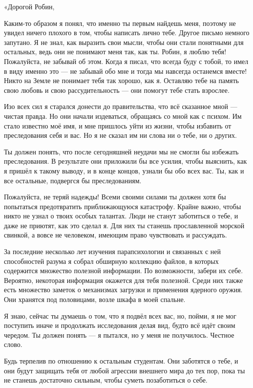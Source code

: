 \documentclass[a5paper, 9pt,
final, openany, twoside=true]{memoir}
\begin{document}
«Дорогой Робин,\bigskip

Каким-то образом я понял, что именно ты первым найдешь меня, поэтому не увидел ничего плохого в том, чтобы написать лично тебе. Другое письмо немного запутано. Я не знал, как выразить свои мысли, чтобы они стали понятными для остальных, ведь они не понимают меня так, как ты. Робин, я люблю тебя! Пожалуйста, не забывай об этом. Когда я писал, что всегда буду с тобой, то имел в виду именно это — не забывай обо мне и тогда мы навсегда останемся вместе! Никто на Земле не понимает тебя так хорошо, как я. Оставляю тебе на память свою любовь и свою рассудительность — они помогут тебе стать взрослее.

Изо всех сил я старался донести до правительства, что всё сказанное мной — чистая правда. Но они начали издеваться, обращаясь со мной как с психом. Им стало известно моё имя, и мне пришлось уйти из жизни, чтобы избавить от преследования себя и вас. Но я не сказал им ни слова ни о тебе, ни о других.

Ты должен понять, что после сегодняшней неудачи мы не смогли бы избежать преследования. В результате они приложили бы все усилия, чтобы выяснить, как я пришёл к такому выводу, и в конце концов, узнали бы обо всех вас. Ты, как и все остальные, подвергся бы преследованиям.

Пожалуйста, не теряй надежды! Всеми своими силами ты должен хотя бы попытаться предотвратить приближающуюся катастрофу. Крайне важно, чтобы никто не узнал о твоих особых талантах. Люди не станут заботиться о тебе, и даже не приютят, как это сделал я. Для них ты станешь прославленной морской свинкой, а вовсе не человеком, имеющим право чувствовать и рассуждать.

За последние несколько лет изучения парапсихологии и связанных с ней способностей разума я собрал обширную коллекцию файлов, в которых содержится множество полезной информации. По возможности, забери их себе. Вероятно, некоторая информация окажется для тебя полезной. Среди них также есть множество заметок о механизмах загрузки и применения ядерного оружия. Они хранятся под половицами, возле шкафа в моей спальне.

Я знаю, сейчас ты думаешь о том, что я подвёл всех вас, но, пойми, я не мог поступить иначе и продолжать исследования делая вид, будто всё идёт своим чередом. Ты должен понять — я пытался, но у меня не получилось. Честное слово.

Будь терпелив по отношению к остальным студентам. Они заботятся о тебе, и они будут защищать тебя от любой агрессии внешнего мира до тех пор, пока ты не станешь достаточно сильным, чтобы суметь позаботиться о себе.
\end{document}
